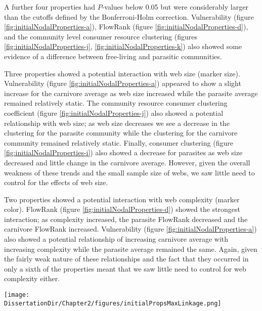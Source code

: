 \documentclass[/home/nkappler/Research/Dissertation/dissertation.tex]{subfiles}
\begin{document}
\begin{bibunit}
A further four properties had $P$-values below 0.05 but were considerably
larger than the cutoffs defined by the Bonferroni-Holm correction.
Vulnerability (figure \ref{fig:initialNodalProperties-a}), FlowRank (figure
\ref{fig:initialNodalProperties-d}), and the community level consumer resource
clustering (figures \ref{fig:initialNodalProperties-j},
\ref{fig:initialNodalProperties-k}) also showed some evidence of a difference
between free-living and parasitic communities. 

Three properties showed a potential interaction with web size (marker size).
Vulnerability (figure \ref{fig:initialNodalProperties-a}) appeared to show a
slight increase for the carnivore average as web size increased while the
parasite average remained relatively static. The community resource consumer
clustering coefficient (figure \ref{fig:initialNodalProperties-j}) also showed
a potential relationship with web size; as web size decreases we see a decrease
in the clustering for the parasite community while the clustering for the
carnivore community remained relatively static. Finally, consumer clustering
(figure \ref{fig:initialNodalProperties-i}) also showed a decrease for
parasites as web size decreased and little change in the carnivore average.
However, given the overall weakness of these trends and the small sample size
of webs, we saw little need to control for the effects of web size.

Two properties showed a potential interaction with web complexity (marker
color). FlowRank (figure \ref{fig:initialNodalProperties-d}) showed the
strongest interaction; as complexity increased, the parasite FlowRank
decreased and the carnivore FlowRank increased. Vulnerability (figure
\ref{fig:initialNodalProperties-a}) also showed a potential relationship of
increasing carnivore average with increasing complexity while the parasite
average remained the same. Again, given the fairly weak nature of these
relationships and the fact that they occurred in only a sixth of the properties
meant that we saw little need to control for web complexity either.

\begin{sidewaysfigure}       
    \centering
    {%
    }%
    \texttt{[image: \\DissertationDir/Chapter2/figures/initialPropsMaxLinkage.png]}


\end{sidewaysfigure}
\end{bibunit}
\end{document}
